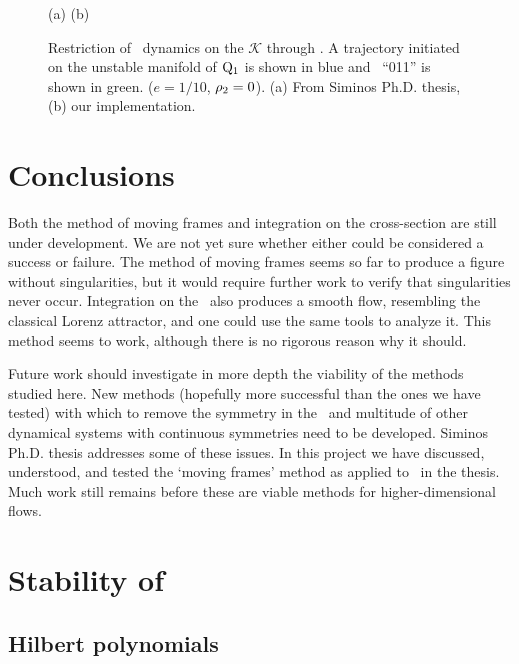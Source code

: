 \begin{figure}[ht]
\begin{center}
(a) %
(b) %
\end{center}
\caption[\CLe\ desymmetrization with transverse integration II]{
Restriction of \cLe\ dynamics on the {\slice} $\mathcal{K}$ through
. A trajectory initiated on the unstable
manifold of $\mathrm{Q}_{1}$ is shown in blue and \rpo\ ``011'' is shown
in green.
($e=1/10$, $\rho_2=0$).
(a) From Siminos Ph.D. thesis, (b) our
implementation.
    }
\label{fig:CLEtransvII}
\end{figure}

\section{Conclusions}

Both the method of moving frames and integration on the
cross-section are still under development. We are not yet
sure whether either could be considered a success or failure.
The method of moving frames seems so far to produce a figure
without singularities, but it would require further work to
verify that singularities never occur. Integration on the
\csection\ also produces a smooth flow, resembling the
classical Lorenz attractor, and one could use the same tools
to analyze it. This method seems to work, although there is
no rigorous reason why it should.

Future work should investigate in more depth the viability of
the methods studied here. New methods (hopefully more
successful than the ones we have tested) with which to remove
the symmetry in the \cLe\ and multitude of other dynamical
systems with continuous symmetries need to be developed.
Siminos Ph.D. thesis addresses some of
these issues. In this project we have discussed, understood,
and tested the `moving frames' method as applied to \cLe\ in
the thesis. Much work still remains before these are viable
methods for higher-dimensional flows.

\section{Stability of \reqva}

\subsection{Hilbert polynomials}

